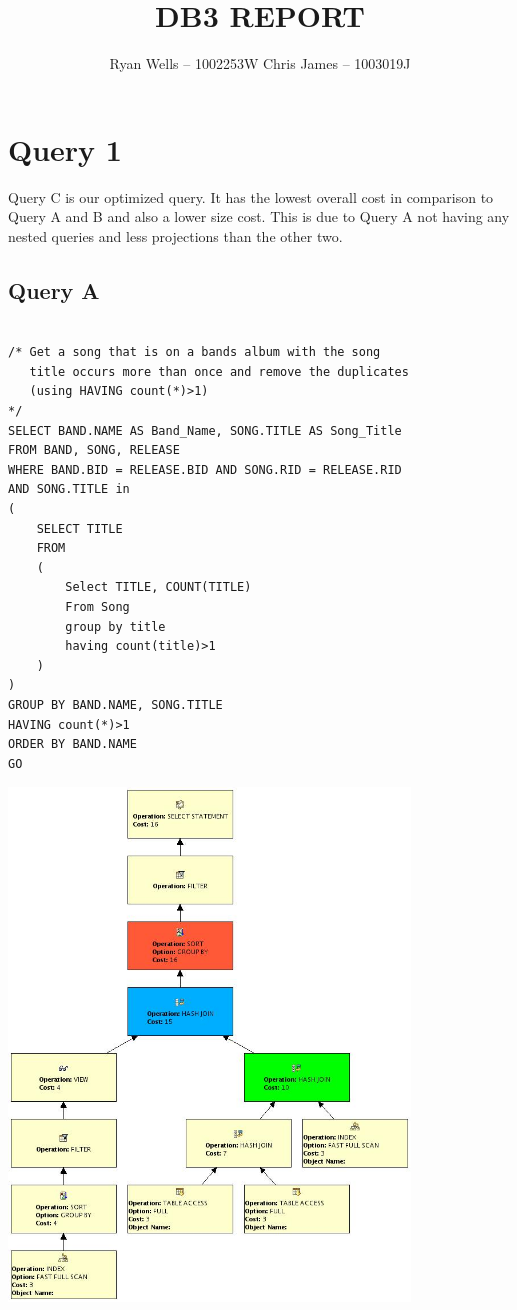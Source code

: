 \documentclass{report}
\title{DB3 REPORT}
\author{Ryan Wells -- 1002253W \n Chris James -- 1003019J}
\begin{document}
\maketitle
\newpage
\section*{Query 1}
Query C is our optimized query. It has the lowest overall cost in
comparison to Query A and B and also a lower size cost. This is due to
Query A not having any nested queries and less projections than the
other two. \\
\subsection*{Query A}
\begin{verbatim}

/* Get a song that is on a bands album with the song 
   title occurs more than once and remove the duplicates
   (using HAVING count(*)>1) 
*/
SELECT BAND.NAME AS Band_Name, SONG.TITLE AS Song_Title
FROM BAND, SONG, RELEASE 
WHERE BAND.BID = RELEASE.BID AND SONG.RID = RELEASE.RID 
AND SONG.TITLE in
(
    SELECT TITLE
    FROM
    (
        Select TITLE, COUNT(TITLE)
        From Song 
        group by title
        having count(title)>1
    )
)
GROUP BY BAND.NAME, SONG.TITLE
HAVING count(*)>1
ORDER BY BAND.NAME
GO
\end{verbatim}
\includegraphics[width=0.8\textwidth]{Q1A}
\end{document}

